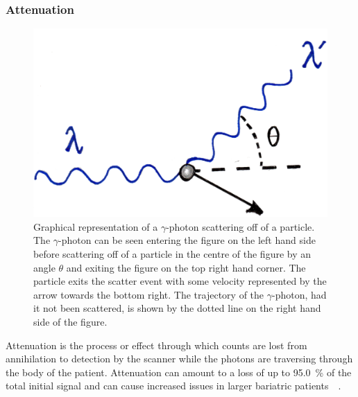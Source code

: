             \subsubsection{Attenuation} \label{sec:attenuation}
                \begin{figure}
                    \centering
                    
                    \includegraphics[width=1.0\linewidth]{figures/background_scatter.png}
                    
                    \captionsetup{singlelinecheck=false, justification=raggedright}
                    \caption{Graphical representation of a $\gamma$-photon scattering off of a particle. The $\gamma$-photon can be seen entering the figure on the left hand side before scattering off of a particle in the centre of the figure by an angle $\theta$ and exiting the figure on the top right hand corner. The particle exits the scatter event with some velocity represented by the arrow towards the bottom right. The trajectory of the $\gamma$-photon, had it not been scattered, is shown by the dotted line on the right hand side of the figure.} \label{fig:attenuation_scatter}
                \end{figure}
                
                Attenuation is the process or effect through which counts are lost from annihilation to detection by the scanner while the photons are traversing through the body of the patient. Attenuation can amount to a loss of up to \SI{95.0}{\percent} of the total initial signal and can cause increased issues in larger bariatric patients~~. %
                
